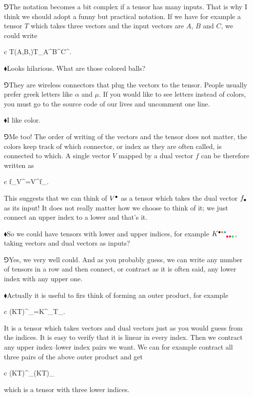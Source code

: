 \documentclass[10pt,oneside%
]{memoir}
\newenvironment{eqna}{\begin{IEEEeqnarray*}{c}}{\end{IEEEeqnarray*}\ignorespacesafterend}
\newcommand{\tensa}[2]{#1_{#2}}
\newcommand{\tensya}[3]{#1^{#2}_{\phantom{#2}#3}}
\newcommand{\hea}{\(\blacklozenge\)\;}
\newcommand{\heb}{\(\Game\)\;}
\newcommand{\coa}{{\color{black}\bullet}}
\newcommand{\cob}{{\color{oranssi}\bullet}}
\newcommand{\coc}{{\color{cyan}\bullet}}
\newcommand{\cod}{{\color{red}\bullet}}
\newcommand{\coe}{{\color{magenta}\bullet}}
\newcommand{\cof}{{\color{green}\bullet}}
\newcommand{\cog}{{\color{safi}\bullet}}
\newcommand{\coh}{{\color{yellow}\bullet}}
\newcommand{\coi}{{\color{blue}\bullet}}
\begin{document}
\heb The notation becomes a bit complex if a tensor has many inputs. That is why I think we should adopt a funny but practical notation. If we have for example a tensor \(T\) which takes three vectors and the input vectors are \(A\), \(B\) and \(C\), we could write
\begin{eqna}
    T(A,B,)\doteq\tensa{T}{\coa\cob\coc}A^\coa B^\cob C^\coc.
\end{eqna}

\hea Looks hilarious. What are those colored balls?

\heb They are wireless connectors that plug the vectors to the tensor. People usually prefer greek letters like \(\alpha\) and \(\mu\). If you would like to see letters instead of colors, you must go to the source code of our lives and uncomment one line.

\hea I like color.

\heb Me too! The order of writing of the vectors and the tensor does not matter, the colors keep track of which connector, or index as they are often called, is connected to which. A single vector \(V\) mapped by a dual vector \(f\) can be therefore written as
\begin{eqna}
    f_\coa V^\coa=V^\coa f_\coa.
\end{eqna}
This suggests that we can think of \(V^\coa\) as a tensor which takes the dual vector \(f_\coa\) as its input! It does not really matter how we choose to think of it; we just connect an upper index to a lower and that's it.

\hea So we could have tensors with lower and upper indices, for example \(\tensya{K}{\coa\cob\coc}{\cod\coe\cof}\), taking vectors and dual vectors as inputs?

\heb Yes, we very well could. And as you probably guess, we can write any number of tensors in a row and then connect, or contract as it is often said, any lower index with any upper one.

\hea Actually it is useful to firs think of forming an outer product, for example
\begin{eqna}
    \tensya{(KT)}{\coa\cob\coc}{\cod\coe\cof\cog\coh\coi}=\tensya{K}{\coa\cob\coc}{\cod\coe\cof}\tensa{T}{\cog\coh\coi}.
\end{eqna}
It is a tensor which takes vectors and dual vectors just as you would guess from the indices. It is easy to verify that it is linear in every index. Then we contract any upper index--lower index pairs we want. We can for example contract all three pairs of the above outer product and get
\begin{eqna}
    \tensya{(KT)}{\coa\cob\coc}{\cod\coe\cof\coa\cob\coc}\doteq\tensa{(KT)}{\cod\coe\cof}
\end{eqna}
which is a tensor with three lower indices.
\end{document}
